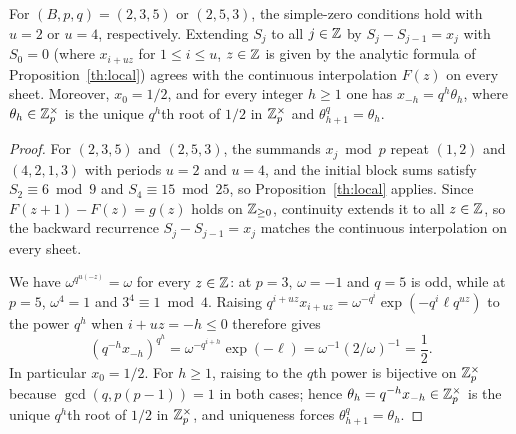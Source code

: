 \documentclass[11pt]{article}
\begin{document}
\begin{lemma}\label{lem:teich}
For $(B,p,q)=(2,3,5)$ or $(2,5,3)$, the simple-zero conditions hold with $u=2$ or $u=4$, respectively. Extending $S_j$ to all $j\in\mathbb Z$ by $S_j-S_{j-1}=x_j$ with $S_0=0$ (where $x_{i+uz}$ for $1\le i\le u$, $z\in\mathbb Z$ is given by the analytic formula of Proposition~\ref{th:local}) agrees with the continuous interpolation $F(z)$ on every sheet. Moreover, $x_0=1/2$, and for every integer $h\ge1$ one has $x_{-h}=q^h\theta_h$, where $\theta_h\in\mathbb Z_p^\times$ is the unique $q^h$th root of $1/2$ in $\mathbb Z_p^\times$ and $\theta_{h+1}^q=\theta_h$.
\end{lemma}
\begin{proof}
For $(2,3,5)$ and $(2,5,3)$, the summands $x_j\bmod p$ repeat $(1,2)$ and $(4,2,1,3)$ with periods $u=2$ and $u=4$, and the initial block sums satisfy $S_2\equiv6\bmod9$ and $S_4\equiv15\bmod25$, so Proposition~\ref{th:local} applies. Since $F(z+1)-F(z)=g(z)$ holds on $\mathbb Z_{\ge0}$, continuity extends it to all $z\in\mathbb Z$, so the backward recurrence $S_j-S_{j-1}=x_j$ matches the continuous interpolation on every sheet.

We have $\omega^{q^{u(-z)}}=\omega$ for every $z\in\mathbb Z$: at $p=3$, $\omega=-1$ and $q=5$ is odd, while at $p=5$, $\omega^4=1$ and $3^4\equiv1\bmod4$. Raising $q^{i+uz}x_{i+uz}=\omega^{-q^i}\exp(-q^i\ell q^{uz})$ to the power $q^h$ when $i+uz=-h\le0$ therefore gives
\[
 (q^{-h}x_{-h})^{q^h}=\omega^{-q^{i+h}}\exp(-\ell)=\omega^{-1}(2/\omega)^{-1}=\frac12.
\]
In particular $x_0=1/2$. For $h\ge1$, raising to the $q$th power is bijective on $\mathbb Z_p^\times$ because $\gcd(q,p(p-1))=1$ in both cases; hence $\theta_h=q^{-h}x_{-h}\in\mathbb Z_p^\times$ is the unique $q^h$th root of $1/2$ in $\mathbb Z_p^\times$, and uniqueness forces $\theta_{h+1}^q=\theta_h$.
\end{proof}
\end{document}
